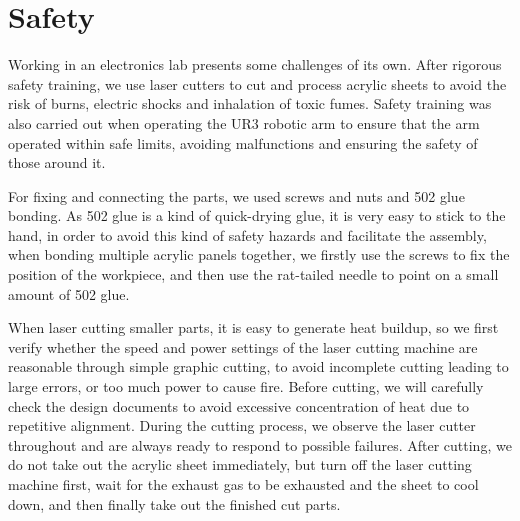 \documentclass{senior-design}
\begin{document}
\section{Safety} 

Working in an electronics lab presents some challenges of its own. After rigorous safety training, we use laser cutters to cut and process acrylic sheets to avoid the risk of burns, electric shocks and inhalation of toxic fumes. Safety training was also carried out when operating the UR3 robotic arm to ensure that the arm operated within safe limits, avoiding malfunctions and ensuring the safety of those around it. 
 
For fixing and connecting the parts, we used screws and nuts and 502 glue bonding. As 502 glue is a kind of quick-drying glue, it is very easy to stick to the hand, in order to avoid this kind of safety hazards and facilitate the assembly, when bonding multiple acrylic panels together, we firstly use the screws to fix the position of the workpiece, and then use the rat-tailed needle to point on a small amount of 502 glue. 
 
When laser cutting smaller parts, it is easy to generate heat buildup, so we first verify whether the speed and power settings of the laser cutting machine are reasonable through simple graphic cutting, to avoid incomplete cutting leading to large errors, or too much power to cause fire. Before cutting, we will carefully check the design documents to avoid excessive concentration of heat due to repetitive alignment. During the cutting process, we observe the laser cutter throughout and are always ready to respond to possible failures. After cutting, we do not take out the acrylic sheet immediately, but turn off the laser cutting machine first, wait for the exhaust gas to be exhausted and the sheet to cool down, and then finally take out the finished cut parts. 
\clearpage
\backmatter
\clearpage
\renewcommand*{\UrlFont}{\rmfamily}
\printbibliography[title={References},heading=bibintoc]
\clearpage
\end{document}
